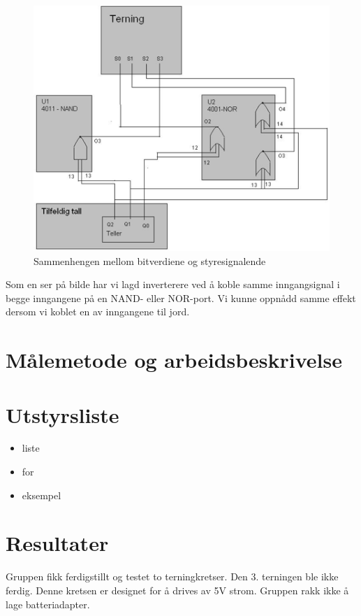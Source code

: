 \documentclass[12pt,norsk,a4paper]{article}
\begin{document}
    \begin{figure}[H]
    \includegraphics[scale=0.75]{Krestkortet.png}
    \caption{Sammenhengen mellom bitverdiene og styresignalende}
    \label{fig:kretskortet}
    \end{figure}

    Som en ser på bilde har vi lagd inverterere ved å koble samme inngangsignal i begge inngangene på en NAND- eller NOR-port. Vi kunne oppnådd samme effekt dersom vi koblet en av inngangene til jord.    

\clearpage

\section{Målemetode og arbeidsbeskrivelse}
\clearpage


\section{Utstyrsliste} 
    \begin{itemize} %
    \item liste     %
    \item for
    \item eksempel
    \end{itemize}
\clearpage


\section{Resultater}
Gruppen fikk ferdigstillt og testet to terningkretser. Den 3. terningen ble ikke ferdig.
Denne kretsen er designet for å drives av 5V strom. Gruppen rakk ikke å lage batteriadapter.
\end{document}
